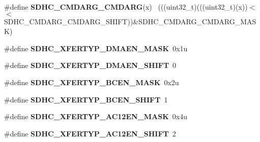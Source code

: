 \begin{DoxyCompactItemize}
\item 
\hypertarget{group___s_d_h_c___register___masks_gaf17d39bc4152b201b9cad32cc96da69b}{}\#define {\bfseries S\+D\+H\+C\+\_\+\+C\+M\+D\+A\+R\+G\+\_\+\+C\+M\+D\+A\+R\+G}(x)                                    ~(((uint32\+\_\+t)(((uint32\+\_\+t)(x))$<$$<$S\+D\+H\+C\+\_\+\+C\+M\+D\+A\+R\+G\+\_\+\+C\+M\+D\+A\+R\+G\+\_\+\+S\+H\+I\+F\+T))\&S\+D\+H\+C\+\_\+\+C\+M\+D\+A\+R\+G\+\_\+\+C\+M\+D\+A\+R\+G\+\_\+\+M\+A\+S\+K)\label{group___s_d_h_c___register___masks_gaf17d39bc4152b201b9cad32cc96da69b}

\item 
\hypertarget{group___s_d_h_c___register___masks_ga4d3f71daacb879dbeb42972d25faa220}{}\#define {\bfseries S\+D\+H\+C\+\_\+\+X\+F\+E\+R\+T\+Y\+P\+\_\+\+D\+M\+A\+E\+N\+\_\+\+M\+A\+S\+K}~0x1u\label{group___s_d_h_c___register___masks_ga4d3f71daacb879dbeb42972d25faa220}

\item 
\hypertarget{group___s_d_h_c___register___masks_ga5cecfd8f158b456d3a2a9ea7820117b2}{}\#define {\bfseries S\+D\+H\+C\+\_\+\+X\+F\+E\+R\+T\+Y\+P\+\_\+\+D\+M\+A\+E\+N\+\_\+\+S\+H\+I\+F\+T}~0\label{group___s_d_h_c___register___masks_ga5cecfd8f158b456d3a2a9ea7820117b2}

\item 
\hypertarget{group___s_d_h_c___register___masks_ga1d7dcef14285859fb5f204d71d2083cc}{}\#define {\bfseries S\+D\+H\+C\+\_\+\+X\+F\+E\+R\+T\+Y\+P\+\_\+\+B\+C\+E\+N\+\_\+\+M\+A\+S\+K}~0x2u\label{group___s_d_h_c___register___masks_ga1d7dcef14285859fb5f204d71d2083cc}

\item 
\hypertarget{group___s_d_h_c___register___masks_ga25223c582d559cd31d3de92191c681c7}{}\#define {\bfseries S\+D\+H\+C\+\_\+\+X\+F\+E\+R\+T\+Y\+P\+\_\+\+B\+C\+E\+N\+\_\+\+S\+H\+I\+F\+T}~1\label{group___s_d_h_c___register___masks_ga25223c582d559cd31d3de92191c681c7}

\item 
\hypertarget{group___s_d_h_c___register___masks_ga1940add41a5918da9c0b045597e0c497}{}\#define {\bfseries S\+D\+H\+C\+\_\+\+X\+F\+E\+R\+T\+Y\+P\+\_\+\+A\+C12\+E\+N\+\_\+\+M\+A\+S\+K}~0x4u\label{group___s_d_h_c___register___masks_ga1940add41a5918da9c0b045597e0c497}

\item 
\hypertarget{group___s_d_h_c___register___masks_ga2e8fdd12bcab3fa4d4e6823eabaf65a0}{}\#define {\bfseries S\+D\+H\+C\+\_\+\+X\+F\+E\+R\+T\+Y\+P\+\_\+\+A\+C12\+E\+N\+\_\+\+S\+H\+I\+F\+T}~2\label{group___s_d_h_c___register___masks_ga2e8fdd12bcab3fa4d4e6823eabaf65a0}


\end{DoxyCompactItemize}
